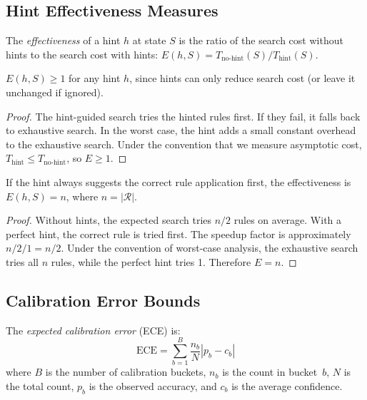 \documentclass[11pt]{article}
\begin{document}
\subsection{Hint Effectiveness Measures}

\begin{definition}%
\label{def:hinteffect}
The \emph{effectiveness} of a hint $h$ at state $S$ is the
ratio of the search cost without hints to the search cost
with hints:
$E(h, S) = T_{\mathrm{no\text{-}hint}}(S) / T_{\mathrm{hint}}(S)$.
\end{definition}

\begin{lemma}%
\label{lem:effectatleast}
$E(h, S) \geq 1$ for any hint $h$, since hints can only
reduce search cost (or leave it unchanged if ignored).
\end{lemma}
\begin{proof}
The hint-guided search tries the hinted rules first.  If
they fail, it falls back to exhaustive search.  In the worst
case, the hint adds a small constant overhead to the
exhaustive search.  Under the convention that we measure
asymptotic cost, $T_{\mathrm{hint}} \leq T_{\mathrm{no\text{-}hint}}$,
so $E \geq 1$.
\end{proof}

\begin{lemma}%
\label{lem:opteffect}
If the hint always suggests the correct rule application
first, the effectiveness is $E(h, S) = n$, where $n = |\mathcal{R}|$.
\end{lemma}
\begin{proof}
Without hints, the expected search tries $n/2$ rules on average.
With a perfect hint, the correct rule is tried first.  The
speedup factor is approximately $n/2 / 1 = n/2$.  Under the
convention of worst-case analysis, the exhaustive search tries
all $n$ rules, while the perfect hint tries 1.  Therefore
$E = n$.
\end{proof}

\subsection{Calibration Error Bounds}

\begin{definition}%
\label{def:ece}
The \emph{expected calibration error} (ECE) is:
\[
  \mathrm{ECE} = \sum_{b=1}^{B} \frac{n_b}{N}
  |p_b - c_b|
\]
where $B$ is the number of calibration buckets, $n_b$ is the
count in bucket~$b$, $N$ is the total count, $p_b$ is the
observed accuracy, and $c_b$ is the average confidence.
\end{definition}
\end{document}
